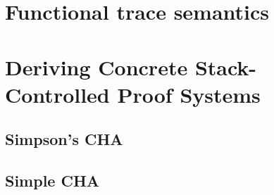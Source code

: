 \section{Functional trace semantics}
\label{sec:func-stacks}

\section{Deriving Concrete Stack-Controlled Proof Systems}
\label{sec:concrete-stack}

\subsection{Simpson's CHA}
\label{sec:simpson-stacks}

\subsection{Simple CHA}
\label{sec:simple-stacks}





